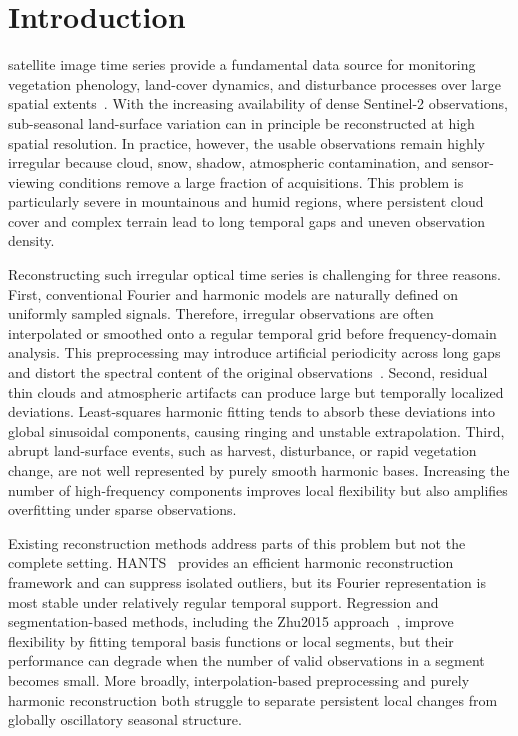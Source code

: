 \documentclass[letterpaper,journal]{IEEEtran}
\begin{document}
\section{Introduction}
 satellite image time series provide a fundamental data source for monitoring vegetation phenology, land-cover dynamics, and disturbance processes over large spatial extents~\cite{ref1,ref2}. With the increasing availability of dense Sentinel-2 observations, sub-seasonal land-surface variation can in principle be reconstructed at high spatial resolution. In practice, however, the usable observations remain highly irregular because cloud, snow, shadow, atmospheric contamination, and sensor-viewing conditions remove a large fraction of acquisitions. This problem is particularly severe in mountainous and humid regions, where persistent cloud cover and complex terrain lead to long temporal gaps and uneven observation density.

Reconstructing such irregular optical time series is challenging for three reasons. First, conventional Fourier and harmonic models are naturally defined on uniformly sampled signals. Therefore, irregular observations are often interpolated or smoothed onto a regular temporal grid before frequency-domain analysis. This preprocessing may introduce artificial periodicity across long gaps and distort the spectral content of the original observations~\cite{ref5}. Second, residual thin clouds and atmospheric artifacts can produce large but temporally localized deviations. Least-squares harmonic fitting tends to absorb these deviations into global sinusoidal components, causing ringing and unstable extrapolation. Third, abrupt land-surface events, such as harvest, disturbance, or rapid vegetation change, are not well represented by purely smooth harmonic bases. Increasing the number of high-frequency components improves local flexibility but also amplifies overfitting under sparse observations.

Existing reconstruction methods address parts of this problem but not the complete setting. HANTS~\cite{ref10} provides an efficient harmonic reconstruction framework and can suppress isolated outliers, but its Fourier representation is most stable under relatively regular temporal support. Regression and segmentation-based methods, including the Zhu2015 approach~\cite{ref14}, improve flexibility by fitting temporal basis functions or local segments, but their performance can degrade when the number of valid observations in a segment becomes small. More broadly, interpolation-based preprocessing and purely harmonic reconstruction both struggle to separate persistent local changes from globally oscillatory seasonal structure.
\end{document}
